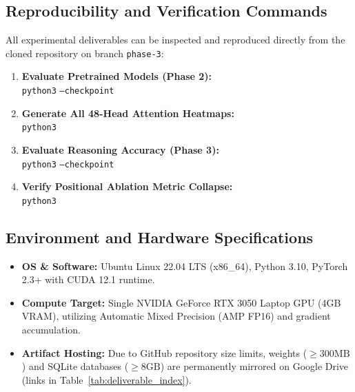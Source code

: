 \documentclass[10pt,a4paper]{article}
\begin{document}
\subsection{Reproducibility and Verification Commands}
All experimental deliverables can be inspected and reproduced directly from the cloned repository on branch \texttt{phase-3}:
\begin{enumerate}[noitemsep,leftmargin=*]
    \item \textbf{Evaluate Pretrained Models (Phase 2):} \\
    {\footnotesize\texttt{python3}  \texttt{--checkpoint} }
    \item \textbf{Generate All 48-Head Attention Heatmaps:} \\
    {\footnotesize\texttt{python3} }
    \item \textbf{Evaluate Reasoning Accuracy (Phase 3):} \\
    {\footnotesize\texttt{python3}  \texttt{--checkpoint} }
    \item \textbf{Verify Positional Ablation Metric Collapse:} \\
    {\footnotesize\texttt{python3} }
\end{enumerate}

\subsection{Environment and Hardware Specifications}
\begin{itemize}[noitemsep,leftmargin=*]
    \item \textbf{OS \& Software:} Ubuntu Linux 22.04 LTS (x86\_64), Python 3.10, PyTorch 2.3+ with CUDA 12.1 runtime.
    \item \textbf{Compute Target:} Single NVIDIA GeForce RTX 3050 Laptop GPU (4GB VRAM), utilizing Automatic Mixed Precision (AMP FP16) and gradient accumulation.
    \item \textbf{Artifact Hosting:} Due to GitHub repository size limits, weights ($\ge 300\text{MB}$) and SQLite databases ($\ge 8\text{GB}$) are permanently mirrored on Google Drive (links in Table~\ref{tab:deliverable_index}).
\end{itemize}
\end{document}
